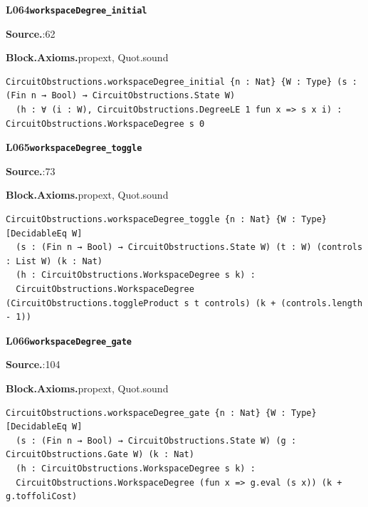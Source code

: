 \par\medskip\noindent\begin{minipage}{\textwidth}
{\small\bfseries L064\enspace\texttt{workspaceDegree\_initial}\par}
{\footnotesize\raggedright\textbf{Source.}\enspace{}:62\par
\textbf{Block.}\quad\textbf{Axioms.}\enspace propext, Quot.sound\par}\nopagebreak
\begin{lstlisting}
CircuitObstructions.workspaceDegree_initial {n : Nat} {W : Type} (s : (Fin n → Bool) → CircuitObstructions.State W)
  (h : ∀ (i : W), CircuitObstructions.DegreeLE 1 fun x => s x i) : CircuitObstructions.WorkspaceDegree s 0
\end{lstlisting}
\end{minipage}\par

\par\medskip\noindent\begin{minipage}{\textwidth}
{\small\bfseries L065\enspace\texttt{workspaceDegree\_toggle}\par}
{\footnotesize\raggedright\textbf{Source.}\enspace{}:73\par
\textbf{Block.}\quad\textbf{Axioms.}\enspace propext, Quot.sound\par}\nopagebreak
\begin{lstlisting}
CircuitObstructions.workspaceDegree_toggle {n : Nat} {W : Type} [DecidableEq W]
  (s : (Fin n → Bool) → CircuitObstructions.State W) (t : W) (controls : List W) (k : Nat)
  (h : CircuitObstructions.WorkspaceDegree s k) :
  CircuitObstructions.WorkspaceDegree (CircuitObstructions.toggleProduct s t controls) (k + (controls.length - 1))
\end{lstlisting}
\end{minipage}\par

\par\medskip\noindent\begin{minipage}{\textwidth}
{\small\bfseries L066\enspace\texttt{workspaceDegree\_gate}\par}
{\footnotesize\raggedright\textbf{Source.}\enspace{}:104\par
\textbf{Block.}\quad\textbf{Axioms.}\enspace propext, Quot.sound\par}\nopagebreak
\begin{lstlisting}
CircuitObstructions.workspaceDegree_gate {n : Nat} {W : Type} [DecidableEq W]
  (s : (Fin n → Bool) → CircuitObstructions.State W) (g : CircuitObstructions.Gate W) (k : Nat)
  (h : CircuitObstructions.WorkspaceDegree s k) :
  CircuitObstructions.WorkspaceDegree (fun x => g.eval (s x)) (k + g.toffoliCost)
\end{lstlisting}
\end{minipage}\par

